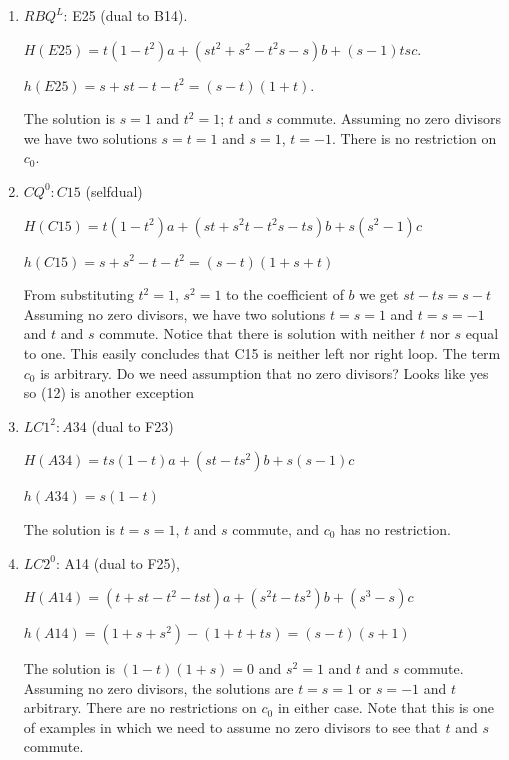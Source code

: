 \documentclass[11pt]{amsart}
\theoremstyle{definition}
\begin{document}
\begin{enumerate}
    
    \item[(11)] $RBQ^L$: E25 (dual to B14).

    $H(E25)= t(1-t^2)a+(st^2+s^2-t^2s-s)b+(s-1)tsc $.

    $h(E25) = s+st -t -t^2=(s-t)(1+t).$

    The solution is $s=1$ and $t^2=1$; $t$ and $s$ commute.  Assuming no zero divisors we have two solutions $s=t=1$ and $s=1$, $t=-1$. There is no restriction on $c_0$.

    
    
    \item[(12)] $CQ^0: C15$ (selfdual) 

    $H(C15)= t(1-t^2)a +(st+s^2t-t^2s-ts)b +s(s^2-1)c $

     $h(C15) = s+s^2 -t-t^2 = (s-t)(1+s+t)$

From substituting $t^2=1$, $s^2=1$ to the coefficient of $b$ we get $st-ts=s-t$
    Assuming no zero divisors, we have two solutions $t=s=1$ and $t=s=-1$ and $t$ and $s$ commute. Notice that there is solution with neither $t$ nor $s$ equal to one. This easily concludes that C15 is neither left nor right loop. The term $c_0$ is arbitrary. 
{\color{red} Do we need assumption that no zero divisors? Looks like yes so (12) is another exception}
    

    
    \item[(13)] $LC1^2: A34$ (dual to F23)

    $H(A34) = ts(1-t)a +(st-ts^2)b+s(s-1)c$

     $h(A34) = s(1-t)$

    The solution is $t=s=1$, $t$ and $s$ commute, and $c_0$ has no restriction.



\item[(14)] $LC2^0$: A14 (dual to F25), 
    

$H(A14)= (t+st-t^2-tst)a+ (s^2t-ts^2)b+ (s^3-s)c$

$h(A14)=(1+s+s^2) - (1+t+ts)=(s-t)(s+1)$

The solution is $(1-t)(1+s)=0$ and $s^2=1$ and  $t$ and $s$ commute. 
 Assuming no zero divisors, the solutions are $t=s=1$ or $s=-1$ and $t$ arbitrary. There are no restrictions on $c_0$ in either case. 
Note that this is one of examples in which we need to assume no zero divisors  to see that $t$ and $s$ commute.



\end{enumerate}
\end{document}
